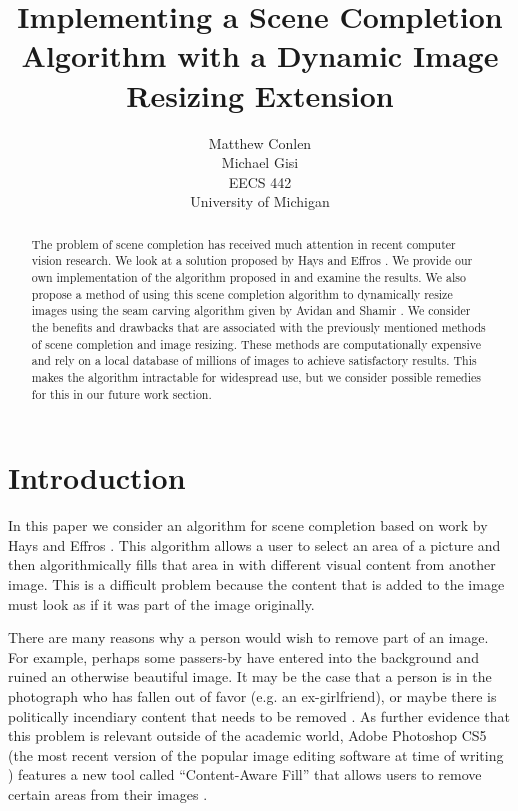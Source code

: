 \documentclass[11pt]{amsart}
\title[Scene Completion and Image Resizing]{Implementing a Scene Completion Algorithm with a Dynamic Image Resizing Extension}
\author{Matthew Conlen \\ Michael Gisi  \\ EECS 442 \\ University of Michigan}
\date{}                                           %
\begin{document}
\maketitle

\begin{abstract}
The problem of scene completion has received much attention in recent computer vision research. We 
look at a solution proposed by Hays and Effros \cite{Hays:2007}. We provide our own implementation of the
algorithm proposed in \cite{Hays:2007} and examine the results. We also propose a method of using this 
scene completion algorithm to dynamically resize images using the seam carving algorithm
given by Avidan and Shamir \cite{Avidan:2007}. We consider the benefits and drawbacks that are associated with the previously mentioned methods of scene completion and image resizing. These methods are computationally expensive and rely on a local database of millions of images to achieve satisfactory results. This makes the algorithm intractable for widespread use, but we consider possible remedies for this in our future work section. 
 
\end{abstract}

\section{Introduction}

In this paper we consider an algorithm for scene completion based on work by Hays and Effros \cite{Hays:2007}. This algorithm allows a user to select an area of a picture and then algorithmically fills that area in with different visual content from another image. This is a difficult problem because the content that is added to the image must look as if it was part of the image originally. 

There are many reasons why a person would wish to remove part of an image. For example, perhaps some passers-by have entered into the background and ruined an otherwise beautiful image. It may be the case that a person is in the photograph who has fallen out of favor (e.g. an ex-girlfriend), or maybe there is politically incendiary content that needs to be removed \cite{King:1997}. As further evidence that this problem is relevant outside of the academic world, Adobe Photoshop CS5 (the most recent version of the popular image editing software at time of writing ) features a new tool called ``Content-Aware Fill'' that allows users to remove certain areas from their images \cite{Barnes:2009}. 
\end{document}
